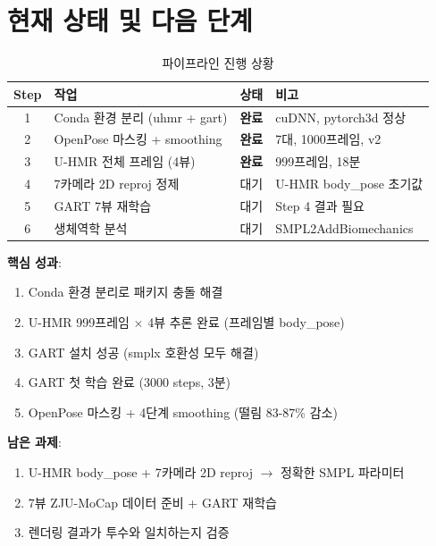 \documentclass[11pt, a4paper]{report}
\begin{document}
\chapter{현재 상태 및 다음 단계}

\begin{table}[H]
\centering
\caption{파이프라인 진행 상황}
\renewcommand{\arraystretch}{1.4}
\begin{tabular}{c p{5cm} c p{4cm}}
\toprule
\textbf{Step} & \textbf{작업} & \textbf{상태} & \textbf{비고} \\
\midrule
1 & Conda 환경 분리 (uhmr + gart) & \textbf{완료} & cuDNN, pytorch3d 정상 \\
2 & OpenPose 마스킹 + smoothing & \textbf{완료} & 7대, 1000프레임, v2 \\
3 & U-HMR 전체 프레임 (4뷰) & \textbf{완료} & 999프레임, 18분 \\
4 & 7카메라 2D reproj 정제 & 대기 & U-HMR body\_pose 초기값 \\
5 & GART 7뷰 재학습 & 대기 & Step 4 결과 필요 \\
6 & 생체역학 분석 & 대기 & SMPL2AddBiomechanics \\
\bottomrule
\end{tabular}
\end{table}

\begin{summary}
\textbf{핵심 성과}:
\begin{enumerate}[leftmargin=*]
  \item Conda 환경 분리로 패키지 충돌 해결
  \item U-HMR 999프레임 $\times$ 4뷰 추론 완료 (프레임별 body\_pose)
  \item GART 설치 성공 (smplx 호환성 모두 해결)
  \item GART 첫 학습 완료 (3000 steps, 3분)
  \item OpenPose 마스킹 + 4단계 smoothing (떨림 83-87\% 감소)
\end{enumerate}

\textbf{남은 과제}:
\begin{enumerate}[leftmargin=*]
  \item U-HMR body\_pose + 7카메라 2D reproj $\rightarrow$ 정확한 SMPL 파라미터
  \item 7뷰 ZJU-MoCap 데이터 준비 + GART 재학습
  \item 렌더링 결과가 투수와 일치하는지 검증
\end{enumerate}
\end{summary}
\end{document}
